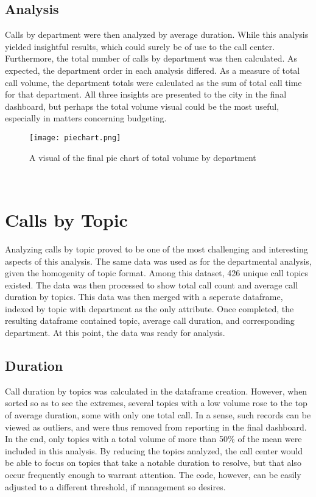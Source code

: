 \documentclass[11pt,twocolumn]{article}
\begin{document}
\subsection{Analysis}
Calls by department were then analyzed by average duration.  While this analysis yielded insightful results, which could surely be of use to the call center.  Furthermore, the total number of calls by department was then calculated.  As expected, the department order in each analysis differed.  As a measure of total call volume, the department totals were calculated as the sum of total call time for that department.  All three insights are presented to the city in the final dashboard, but perhaps the total volume visual could be the most useful, especially in matters concerning budgeting.
\begin{figure}[h]
  \texttt{[image: piechart.png]}
  \caption{A visual of the final pie chart of total volume by department}
 \end{figure}
\\
 
\section{Calls by Topic}
Analyzing calls by topic proved to be one of the most challenging and interesting aspects of this analysis.  The same data was used as for the departmental analysis, given the homogenity of topic format.  Among this dataset, 426 unique call topics existed.  The data was then processed to show total call count and average call duration by topics.  This data was then merged with a seperate dataframe, indexed by topic with department as the only attribute.  Once completed, the resulting dataframe contained topic, average call duration, and corresponding department.  At this point, the data was ready for analysis.
\subsection{Duration}
Call duration by topics was calculated in the dataframe creation.  However, when sorted so as to see the extremes, several topics with a low volume rose to the top of average duration, some with only one total call.  In a sense, such records can be viewed as outliers, and were thus removed from reporting in the final dashboard.  In the end, only topics with a total volume of more than 50\% of the mean were included in this analysis.  By reducing the topics analyzed, the call center would be able to focus on topics that take a notable duration to resolve, but that also occur frequently enough to warrant attention.  The code, however, can be easily adjusted to a different threshold, if management so desires.
\\
\end{document}
